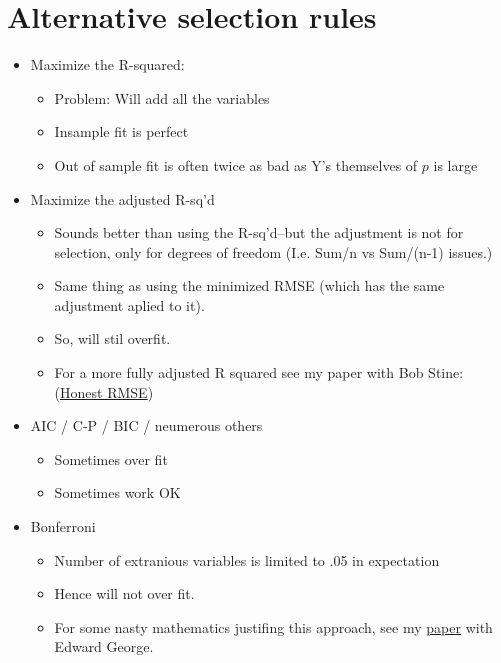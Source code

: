 \documentclass{article}
\begin{document}
\section{Alternative selection rules}
\begin{itemize}
\item Maximize the R-squared:
\begin{itemize}
\item Problem: Will add all the variables
\item Insample fit is perfect
\item Out of sample fit is often twice as bad as Y's themselves of $p$
is large
\end{itemize}
\item Maximize the adjusted R-sq'd
\begin{itemize}
\item Sounds better than using the R-sq'd--but the adjustment is not
 for selection, only for degrees of freedom (I.e. Sum/n vs Sum/(n-1)
 issues.)
\item Same thing as using the minimized RMSE (which has the same
adjustment aplied to it).
\item So, will stil overfit.
\item For a more fully adjusted R squared see my paper with Bob Stine:
(\href{http://www-stat.wharton.upenn.edu/\~stine/research/honests2.pdf}{Honest RMSE})
\end{itemize}
\item AIC / C-P / BIC / neumerous others
\begin{itemize}
\item Sometimes over fit
\item Sometimes work OK
\end{itemize}
\item Bonferroni
\begin{itemize}
\item Number of extranious variables is limited to .05 in expectation
\item Hence will not over fit.
\item For some nasty mathematics justifing this approach, see my
\href{\~foster/research/risk_inflation.pdf}{paper} with Edward George.
\end{itemize}
\end{itemize}
\end{document}
